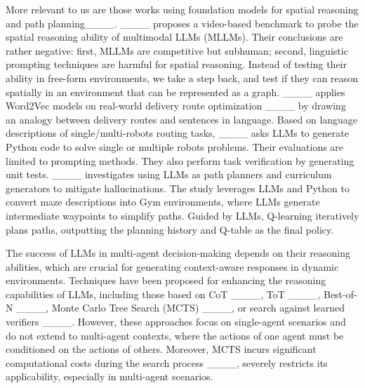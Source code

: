 More relevant to us are those works using foundation models for spatial reasoning and path planning____. ____ proposes a video-based benchmark to probe the spatial reasoning ability of multimodal LLMs (MLLMs). Their conclusions are rather negative: first, MLLMs are competitive but subhuman; second, linguistic prompting techniques are harmful for spatial reasoning. Instead of testing their ability in free-form environments, we take a step back, and test if they can reason spatially in an environment that can be represented as a graph. ____ applies Word2Vec models on real-world delivery route optimization ____ by drawing an analogy between delivery routes and sentences in language. Based on language descriptions of single/multi-robots routing tasks, ____ asks LLMs to generate Python code to solve single or multiple robots problems. Their evaluations are limited to prompting methods. They also perform task verification by generating unit tests. ____ investigates using LLMs as path planners and curriculum generators to mitigate hallucinations. The study leverages LLMs and Python to convert maze descriptions into Gym environments, where LLMs generate intermediate waypoints to simplify paths. Guided by LLMs, Q-learning iteratively plans paths, outputting the planning history and Q-table as the final policy.

The success of LLMs in multi-agent decision-making depends on their reasoning abilities, which are crucial for generating context-aware responses in dynamic environments. Techniques have been proposed for enhancing the reasoning capabilities of LLMs, including those based on CoT ____, ToT ____, Best-of-N ____, Monte Carlo Tree Search (MCTS) ____, or search against learned verifiers ____. However, these approaches focus on single-agent scenarios and do not extend to multi-agent contexts, where the actions of one agent must be conditioned on the actions of others. Moreover, MCTS incurs significant computational costs during the search process ____, severely restricts its applicability, especially in multi-agent scenarios. 



%